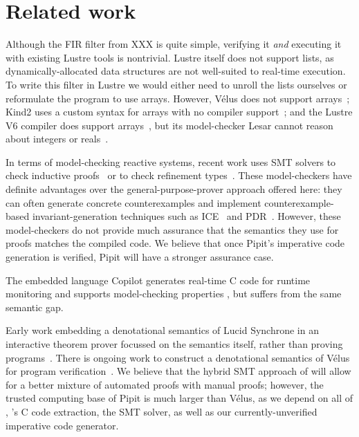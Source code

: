 
\section{Related work}
\label{s:related-work}


Although the FIR filter from XXX is quite simple, verifying it \emph{and} executing it with existing Lustre tools is nontrivial.
Lustre itself does not support lists, as dynamically-allocated data structures are not well-suited to real-time execution.
To write this filter in Lustre we would either need to unroll the lists ourselves or reformulate the program to use arrays.
However, Vélus does not support arrays~\cite{bourke2017formally}; Kind2 uses a custom syntax for arrays with no compiler support~\cite{champion2016kind2}; and the Lustre V6 compiler does support arrays~\cite{jahier2016lustre}, but its model-checker Lesar cannot reason about integers or reals~\cite{raymond2008synchronous}.

 \cite{brun2023equation}

In terms of model-checking reactive systems,
recent work uses SMT solvers to check inductive proofs~\cite{hagen2008scaling,champion2016kind2} or to check refinement types~\cite{chen2022synchronous}.
These model-checkers have definite advantages over the general-purpose-prover approach offered here: they can often generate concrete counterexamples and implement counterexample-based invariant-generation techniques such as ICE~\cite{garg2014ice} and PDR~\cite{bradley2011sat,een2011efficient}.
However, these model-checkers do not provide much assurance that the semantics they use for proofs matches the compiled code.
We believe that once Pipit's imperative code generation is verified, Pipit will have a stronger assurance case.

The embedded language Copilot generates real-time C code for runtime monitoring and supports model-checking properties \cite{laurent2015assuring}, but suffers from the same semantic gap.

Early work embedding a denotational semantics of Lucid Synchrone in an interactive theorem prover focussed on the semantics itself, rather than proving programs~\cite{boulme2001clocked}.
There is ongoing work to construct a denotational semantics of Vélus for program verification~\cite{bourke2022towards}.
We believe that the hybrid SMT approach of \fstar{} will allow for a better mixture of automated proofs with manual proofs;
however, the trusted computing base of Pipit is much larger than Vélus, as we depend on all of \fstar{}, \lowstar{}'s C code extraction, the SMT solver, as well as our currently-unverified imperative code generator.

